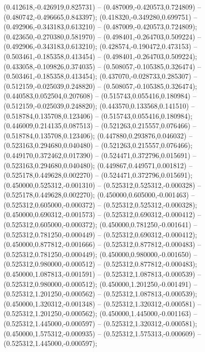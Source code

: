  (0.412618,-0.426919,0.825731) -- (0.487009,-0.420573,0.724809) -- (0.480742,-0.496665,0.843397);
 (0.418320,-0.349280,0.699751) -- (0.492906,-0.343183,0.613210) -- (0.487009,-0.420573,0.724809);
 (0.423650,-0.270380,0.581970) -- (0.498401,-0.264703,0.509224) -- (0.492906,-0.343183,0.613210);
 (0.428574,-0.190472,0.473153) -- (0.503461,-0.185358,0.413454) -- (0.498401,-0.264703,0.509224);
 (0.433058,-0.109826,0.374035) -- (0.508057,-0.105385,0.326474) -- (0.503461,-0.185358,0.413454);
 (0.437070,-0.028733,0.285307) -- (0.512159,-0.025039,0.248820) -- (0.508057,-0.105385,0.326474);
 (0.440583,0.052504,0.207608) -- (0.515743,0.055416,0.180984) -- (0.512159,-0.025039,0.248820);
 (0.443570,0.133568,0.141510) -- (0.518784,0.135708,0.123406) -- (0.515743,0.055416,0.180984);
 (0.446009,0.214135,0.087513) -- (0.521263,0.215557,0.076466) -- (0.518784,0.135708,0.123406);
 (0.447880,0.293876,0.046032) -- (0.523163,0.294680,0.040480) -- (0.521263,0.215557,0.076466);
 (0.449170,0.372462,0.017390) -- (0.524471,0.372796,0.015691) -- (0.523163,0.294680,0.040480);
 (0.449867,0.449571,0.001812) -- (0.525178,0.449628,0.002270) -- (0.524471,0.372796,0.015691);
 (0.450000,0.525312,-0.001310) -- (0.525312,0.525312,-0.000328) -- (0.525178,0.449628,0.002270);
 (0.450000,0.605000,-0.001463) -- (0.525312,0.605000,-0.000372) -- (0.525312,0.525312,-0.000328);
 (0.450000,0.690312,-0.001573) -- (0.525312,0.690312,-0.000412) -- (0.525312,0.605000,-0.000372);
 (0.450000,0.781250,-0.001641) -- (0.525312,0.781250,-0.000449) -- (0.525312,0.690312,-0.000412);
 (0.450000,0.877812,-0.001666) -- (0.525312,0.877812,-0.000483) -- (0.525312,0.781250,-0.000449);
 (0.450000,0.980000,-0.001650) -- (0.525312,0.980000,-0.000512) -- (0.525312,0.877812,-0.000483);
 (0.450000,1.087813,-0.001591) -- (0.525312,1.087813,-0.000539) -- (0.525312,0.980000,-0.000512);
 (0.450000,1.201250,-0.001491) -- (0.525312,1.201250,-0.000562) -- (0.525312,1.087813,-0.000539);
 (0.450000,1.320312,-0.001348) -- (0.525312,1.320312,-0.000581) -- (0.525312,1.201250,-0.000562);
 (0.450000,1.445000,-0.001163) -- (0.525312,1.445000,-0.000597) -- (0.525312,1.320312,-0.000581);
 (0.450000,1.575312,-0.000935) -- (0.525312,1.575313,-0.000609) -- (0.525312,1.445000,-0.000597);
